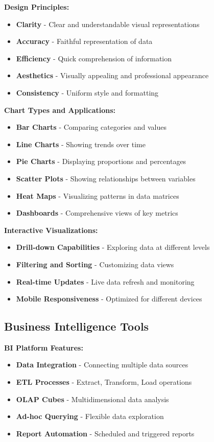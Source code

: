 \documentclass[12pt]{article}
\begin{document}
\textbf{Design Principles:}
\begin{itemize}
    \item \textbf{Clarity} - Clear and understandable visual representations
    \item \textbf{Accuracy} - Faithful representation of data
    \item \textbf{Efficiency} - Quick comprehension of information
    \item \textbf{Aesthetics} - Visually appealing and professional appearance
    \item \textbf{Consistency} - Uniform style and formatting
\end{itemize}

\textbf{Chart Types and Applications:}
\begin{itemize}
    \item \textbf{Bar Charts} - Comparing categories and values
    \item \textbf{Line Charts} - Showing trends over time
    \item \textbf{Pie Charts} - Displaying proportions and percentages
    \item \textbf{Scatter Plots} - Showing relationships between variables
    \item \textbf{Heat Maps} - Visualizing patterns in data matrices
    \item \textbf{Dashboards} - Comprehensive views of key metrics
\end{itemize}

\textbf{Interactive Visualizations:}
\begin{itemize}
    \item \textbf{Drill-down Capabilities} - Exploring data at different levels
    \item \textbf{Filtering and Sorting} - Customizing data views
    \item \textbf{Real-time Updates} - Live data refresh and monitoring
    \item \textbf{Mobile Responsiveness} - Optimized for different devices
\end{itemize}

\subsection{Business Intelligence Tools}

\textbf{BI Platform Features:}
\begin{itemize}
    \item \textbf{Data Integration} - Connecting multiple data sources
    \item \textbf{ETL Processes} - Extract, Transform, Load operations
    \item \textbf{OLAP Cubes} - Multidimensional data analysis
    \item \textbf{Ad-hoc Querying} - Flexible data exploration
    \item \textbf{Report Automation} - Scheduled and triggered reports
\end{itemize}
\end{document}
